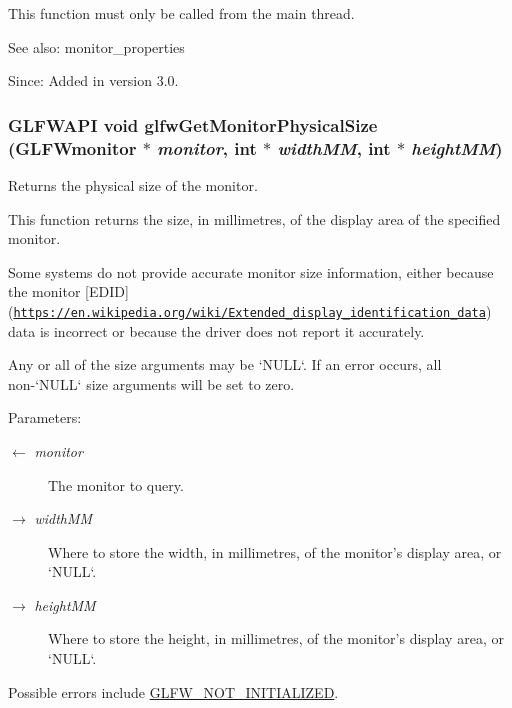 This function must only be called from the main thread.

\begin{Desc}
\item[See also:]monitor\_\-properties\end{Desc}
\begin{Desc}
\item[Since:]Added in version 3.0. \end{Desc}
\hypertarget{group__monitor_gd0e93a9e42b32394369cabbbdc1ab702}{
\subsubsection[glfwGetMonitorPhysicalSize]{\setlength{\rightskip}{0pt plus 5cm}GLFWAPI void glfwGetMonitorPhysicalSize ({\bf GLFWmonitor} $\ast$ {\em monitor}, \/  int $\ast$ {\em widthMM}, \/  int $\ast$ {\em heightMM})}}
\label{group__monitor_gd0e93a9e42b32394369cabbbdc1ab702}


Returns the physical size of the monitor. 

This function returns the size, in millimetres, of the display area of the specified monitor.

Some systems do not provide accurate monitor size information, either because the monitor \mbox{[}EDID\mbox{]}(\href{https://en.wikipedia.org/wiki/Extended_display_identification_data}{\tt https://en.wikipedia.org/wiki/Extended\_\-display\_\-identification\_\-data}) data is incorrect or because the driver does not report it accurately.

Any or all of the size arguments may be `NULL`. If an error occurs, all non-`NULL` size arguments will be set to zero.

\begin{Desc}
\item[Parameters:]
\begin{description}
\item[\mbox{$\leftarrow$} {\em monitor}]The monitor to query. \item[\mbox{$\rightarrow$} {\em widthMM}]Where to store the width, in millimetres, of the monitor's display area, or `NULL`. \item[\mbox{$\rightarrow$} {\em heightMM}]Where to store the height, in millimetres, of the monitor's display area, or `NULL`.\end{description}
\end{Desc}
Possible errors include \hyperlink{group__errors_g2374ee02c177f12e1fa76ff3ed15e14a}{GLFW\_\-NOT\_\-INITIALIZED}.

